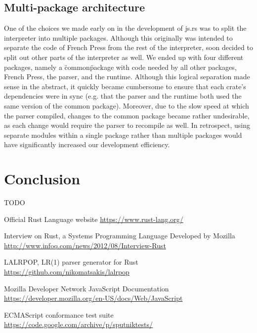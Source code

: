 \documentclass{article}
\begin{document}
\begin{multicols}{2}
\subsection*{Multi-package architecture}

One of the choices we made early on in the development of js.rs was to split the
interpreter into multiple packages. Although this originally was intended to
separate the code of French Press from the rest of the interpreter, soon decided
to split out other parts of the interpreter as well. We ended up with four
different packages, namely a \"common\" package with code needed by all other
packages, French Press, the parser, and the runtime. Although this logical
separation made sense in the abstract, it quickly became cumbersome to ensure
that each crate's dependencies were in sync (e.g. that the parser and the
runtime both used the same version of the common package). Moreover, due to the
slow speed at which the parser compiled, changes to the common package became
rather undesirable, as each change would require the parser to recompile as
well. In retrospect, using separate modules within a single package rather than
multiple packages would have significantly increased our development efficiency.

\section{Conclusion}

TODO

\end{multicols}

\pagebreak

\begin{thebibliography}{9}
  Official Rust Language website
  \href{https://www.rust-lang.org/}{https://www.rust-lang.org/}

  Interview on Rust, a Systems Programming Language Developed by Mozilla
  \href{http://www.infoq.com/news/2012/08/Interview-Rust}{http://www.infoq.com/news/2012/08/Interview-Rust}

  LALRPOP, LR(1) parser generator for Rust
  \href{https://github.com/nikomatsakis/lalrpop}{https://github.com/nikomatsakis/lalrpop}

  Mozilla Developer Network JavaScript Documentation
  \href{https://developer.mozilla.org/en-US/docs/Web/JavaScript}{https://developer.mozilla.org/en-US/docs/Web/JavaScript}

  ECMAScript conformance test suite
  \href{https://code.google.com/archive/p/sputniktests/}{https://code.google.com/archive/p/sputniktests/}
\end{thebibliography}
\end{document}
